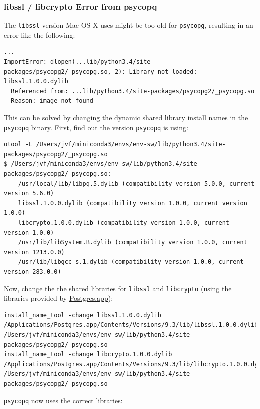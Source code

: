 \documentclass[paper=a4, fontsize=11pt]{scrartcl} %
\numberwithin{equation}{section} %
\numberwithin{figure}{section} %
\numberwithin{table}{section} %
\begin{document}
\subsubsection*{libssl / libcrypto Error from
psycopq}\label{libssl-libcrypto-error-from-psycopq}

The \texttt{libssl} version Mac OS X uses might be too old for
\texttt{psycopg}, resulting in an error like the following:

\begin{lstlisting}[breaklines=true]
...
ImportError: dlopen(...lib/python3.4/site-packages/psycopg2/_psycopg.so, 2): Library not loaded: libssl.1.0.0.dylib
  Referenced from: ...lib/python3.4/site-packages/psycopg2/_psycopg.so
  Reason: image not found
\end{lstlisting}

This can be solved by changing the dynamic shared library install names
in the \texttt{psycopq} binary. First, find out the version
\texttt{psycopq} is using:

\begin{lstlisting}[breaklines=true]
otool -L /Users/jvf/miniconda3/envs/env-sw/lib/python3.4/site-packages/psycopg2/_psycopg.so
$ /Users/jvf/miniconda3/envs/env-sw/lib/python3.4/site-packages/psycopg2/_psycopg.so:
    /usr/local/lib/libpq.5.dylib (compatibility version 5.0.0, current version 5.6.0)
    libssl.1.0.0.dylib (compatibility version 1.0.0, current version 1.0.0)
    libcrypto.1.0.0.dylib (compatibility version 1.0.0, current version 1.0.0)
    /usr/lib/libSystem.B.dylib (compatibility version 1.0.0, current version 1213.0.0)
    /usr/lib/libgcc_s.1.dylib (compatibility version 1.0.0, current version 283.0.0)
\end{lstlisting}

Now, change the the shared libraries for \texttt{libssl} and
\texttt{libcrypto} (using the libraries provided by
\href{http://postgresapp.com}{Postgres.app}):

\begin{lstlisting}[breaklines=true]
install_name_tool -change libssl.1.0.0.dylib /Applications/Postgres.app/Contents/Versions/9.3/lib/libssl.1.0.0.dylib /Users/jvf/miniconda3/envs/env-sw/lib/python3.4/site-packages/psycopg2/_psycopg.so
install_name_tool -change libcrypto.1.0.0.dylib /Applications/Postgres.app/Contents/Versions/9.3/lib/libcrypto.1.0.0.dylib /Users/jvf/miniconda3/envs/env-sw/lib/python3.4/site-packages/psycopg2/_psycopg.so
\end{lstlisting}

\texttt{psycopq} now uses the correct libraries:
\end{document}
